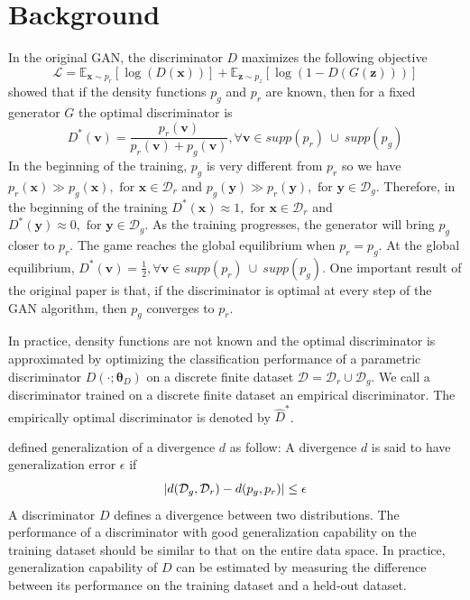 \documentclass{article} %
\begin{document}
\section{Background}
In the original GAN, the discriminator $D$ maximizes the following objective
\begin{equation}
\label{eqn:ganloss}
\mathcal{L} = \mathbb{E}_{\bm x \sim p_r} [\log(D(\bm x))] + \mathbb{E}_{\bm z \sim p_z} [\log(1 - D(G(\bm z)))]
\end{equation}
\cite{gan} showed that if the density functions $p_g$ and $p_r$ are known, then for a fixed generator $G$ the optimal discriminator is 
\begin{equation}
D^*(\bm v) = \frac{p_r(\bm v)}{p_r(\bm v) + p_g(\bm v)}, \forall \bm v \in supp(p_r) \ \cup\ supp(p_g) \label{eqn:optimD}
\end{equation}
In the beginning of the training, $p_g$ is very different from $p_r$ so we have
$ p_r(\bm x) \gg p_g(\bm x), \text{ for } \bm x \in \mathcal{D}_r $ and
$ p_g(\bm y) \gg p_r(\bm y), \text{ for } \bm y \in \mathcal{D}_g $.
Therefore, in the beginning of the training
$D^*(\bm x) \approx 1, \text{ for } \bm x \in \mathcal{D}_r $ and 
$D^*(\bm y) \approx 0, \text{ for } \bm y \in \mathcal{D}_g $.
As the training progresses, the generator will bring $p_g$ closer to $p_r$. The game reaches the global equilibrium when $p_r = p_g$. At the global equilibrium,
$ D^*(\bm v) = \frac{1}{2}, \forall \bm v \in supp(p_r) \ \cup\ supp(p_g)$.
One important result of the original paper is that, if the discriminator is optimal at every step of the GAN algorithm, then $p_g$ converges to $p_r$.

In practice, density functions are not known and the optimal discriminator is approximated by optimizing the classification performance of a parametric discriminator $D(\cdot; \bm \theta_D)$ on a discrete finite dataset $\mathcal{D} = \mathcal{D}_r \cup \mathcal{D}_g$. We call a discriminator trained on a discrete finite dataset an empirical discriminator. The empirically optimal discriminator is denoted by $\hat{D}^*$. 

\cite{equiAndGeneralization} defined generalization of a divergence  $d$ as follow: A divergence $d$ is said to have generalization error $\epsilon$ if 
\begin{equation}
\abs{d(\mathcal{D}_g, \mathcal{D}_r) - d(p_g, p_r)} \le \epsilon
\label{eqn:generalization}
\end{equation}
A discriminator $D$ defines a divergence between two distributions. The performance of a discriminator with good generalization capability on the training dataset should be similar to that on the entire data space. In practice, generalization capability of $D$ can be estimated by measuring the difference between its performance on the training dataset and a held-out dataset.
\end{document}
